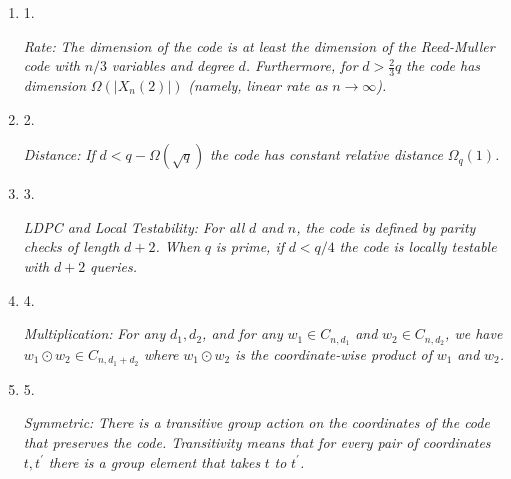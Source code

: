 \documentclass[10pt,a4paper]{article}
\begin{document}
\begin{enumerate}


\item[] 
1. 


\emph{Rate:}\emph{ The dimension of the code is at least the dimension of the Reed-Muller code with }$n/3$\emph{ variables and degree }$d$\emph{. Furthermore, for }$d>\frac{2}{3}q$\emph{ the code has dimension }$\Omega(\lvert X_{n}(2)\rvert)$\emph{ (namely, linear rate as }$n\to\infty$\emph{).}\par





\item[] 
2. 


\emph{Distance:}\emph{ If }$d<q-\Omega(\sqrt{q})$\emph{ the code has constant relative distance }$\Omega_{q}(1)$\emph{.}\par





\item[] 
3. 


\emph{LDPC and Local Testability:}\emph{
For all }$d$\emph{ and }$n$\emph{, the code is defined by parity checks of length }$d+2$\emph{. When }$q$\emph{ is prime, if }$d<q/4$\emph{ the code is locally testable with }$d+2$\emph{ queries.}\par





\item[] 
4. 


\emph{Multiplication:}\emph{ For any }$d_{1},d_{2}$\emph{, and for any }$w_{1}\in C_{n,d_{1}}$\emph{ and }$w_{2}\in C_{n,d_{2}}$\emph{, we have }$w_{1}\odot w_{2}\in C_{n,d_{1}+d_{2}}$\emph{ where }$w_{1}\odot w_{2}$\emph{ is the coordinate-wise product of }$w_{1}$\emph{ and }$w_{2}$\emph{.}\par





\item[] 
5. 


\emph{Symmetric:}\emph{ There is a transitive group action on the coordinates of the code that preserves the code. Transitivity means that for every pair of coordinates }$t,t^{\prime}$\emph{ there is a group element that takes }$t$\emph{ to }$t^{\prime}$\emph{.}\par





\end{enumerate}
\end{document}

